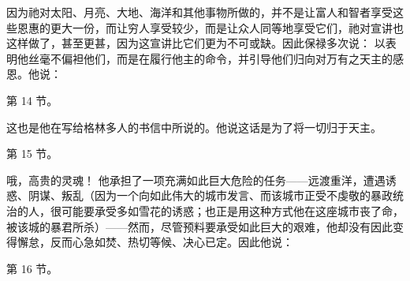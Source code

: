因为祂对太阳、月亮、大地、海洋和其他事物所做的，并不是让富人和智者享受这些恩惠的更大一份，而让穷人享受较少，而是让众人同等地享受它们，祂对宣讲也这样做了，甚至更甚，因为这宣讲比它们更为不可或缺。因此保禄多次说： 以表明他丝毫不偏袒他们，而是在履行他主的命令，并引导他们归向对万有之天主的感恩。他说：\par

第 14 节。 \par

这也是他在写给格林多人的书信中所说的。他说这话是为了将一切归于天主。\par

第 15 节。 \par

哦，高贵的灵魂！ 他承担了一项充满如此巨大危险的任务——远渡重洋，遭遇诱惑、阴谋、叛乱（因为一个向如此伟大的城市发言、而该城市正受不虔敬的暴政统治的人，很可能要承受多如雪花的诱惑；也正是用这种方式他在这座城市丧了命，被该城的暴君所杀）——然而，尽管预料要承受如此巨大的艰难，他却没有因此变得懈怠，反而心急如焚、热切等候、决心已定。因此他说：\par

第 16 节。 \par

